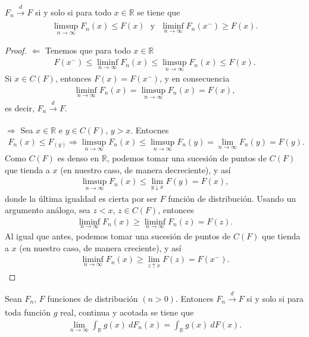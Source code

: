 \begin{lema}
    $F_n \xrightarrow[]{d} F$ si y solo si para todo $x \in \mathbb{R}$ se tiene que
    \begin{align*}
        \limsup_{n \to \infty} F_n(x) \leq F(x) \ \ \ \text{y} \ \ \ \liminf_{n \to \infty} F_n(x^-) \ge F(x).
    \end{align*}
\end{lema}

\begin{proof}
    $\boxed{\Longleftarrow}$ Tenemos que para todo $x \in \mathbb{R}$
    \begin{align*}
        F(x^-) \leq \liminf_{n \to \infty} F_n(x) \leq \limsup_{n \to \infty} F_n(x) \leq F(x).
    \end{align*}
    Si $x \in C(F)$, entonces $F(x) = F(x^-)$, y en consecuencia
    \begin{align*}
        \liminf_{n \to \infty} F_n(x) = \limsup_{n \to \infty} F_n(x) = F(x),
    \end{align*}
    es decir, $F_n \xrightarrow[]{d} F$.

    $\boxed{\Longrightarrow}$ Sea $x \in \mathbb{R}$ e $y \in C(F)$, $y > x$. Entocnes
    \begin{align*}
        F_n(x) \leq F_(y) \Longrightarrow \limsup_{n \to \infty} F_n(x) \leq \limsup_{n \to \infty} F_n(y) = \lim_{n \to \infty} F_n(y) = F(y).
    \end{align*}
    Como $C(F)$ es denso en $\mathbb{R}$, podemos tomar una sucesión de puntos de $C(F)$ que tienda a $x$ (en nuestro caso, de manera decreciente), y así
    \begin{align*}
        \limsup_{n \to \infty} F_n(x) \leq \lim_{y \downarrow x} F(y) = F(x),
    \end{align*}
    donde la última igualdad es cierta por ser $F$ función de distribución. Usando un argumento análogo, sea $z < x$, $z \in C(F)$, entonces
    \begin{align*}
        \liminf_{n \to \infty} F_n(x) \ge \liminf_{n \to \infty} F_n(z) = F(z).
    \end{align*}
    Al igual que antes, podemos tomar una sucesión de puntos de $C(F)$ que tienda a $x$ (en nuestro caso, de manera creciente), y así
    \begin{align*}
        \liminf_{n \to \infty} F_n(x) \ge \lim_{z \uparrow x} F(z) = F(x^-).
    \end{align*}
\end{proof}

\begin{teo}
    Sean $F_n$, $F$ funciones de distribución $(n > 0)$. Entonces $F_n \xrightarrow[]{d} F$ si y solo si para toda función $g$ real, continua y acotada se tiene que
    \begin{align*}
        \lim_{n \to \infty} \int_{\mathbb{R}} g(x) \ dF_n(x) = \int_{\mathbb{R}} g(x) \ dF(x).
    \end{align*}
\end{teo}

